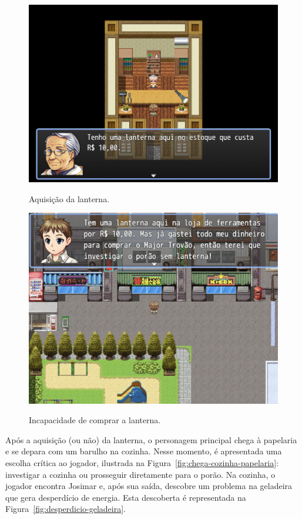 \begin{figure}[!htbp]
	\centering
	\caption{Aquisição da lanterna.}
	\includegraphics[scale=0.5]{Textuais/Pictures/compra-lanterna.png}
	\label{fig:compra-lanterna}
\end{figure}

\begin{figure}[!htbp]
	\centering
	\caption{Incapacidade de comprar a lanterna.}
	\includegraphics[scale=0.4]{Textuais/Pictures/nao-compra-lanterna.png}
	\label{fig:nao-compra-lanterna}
\end{figure}

Após a aquisição (ou não) da lanterna, o personagem principal chega à papelaria e se depara com um barulho na cozinha. Nesse momento, é apresentada uma escolha crítica ao jogador, ilustrada na Figura~\ref{fig:chega-cozinha-papelaria}: investigar a cozinha ou prosseguir diretamente para o porão. Na cozinha, o jogador encontra Josimar e, após sua saída, descobre um problema na geladeira que gera desperdício de energia. Esta descoberta é representada na Figura~\ref{fig:desperdicio-geladeira}.

